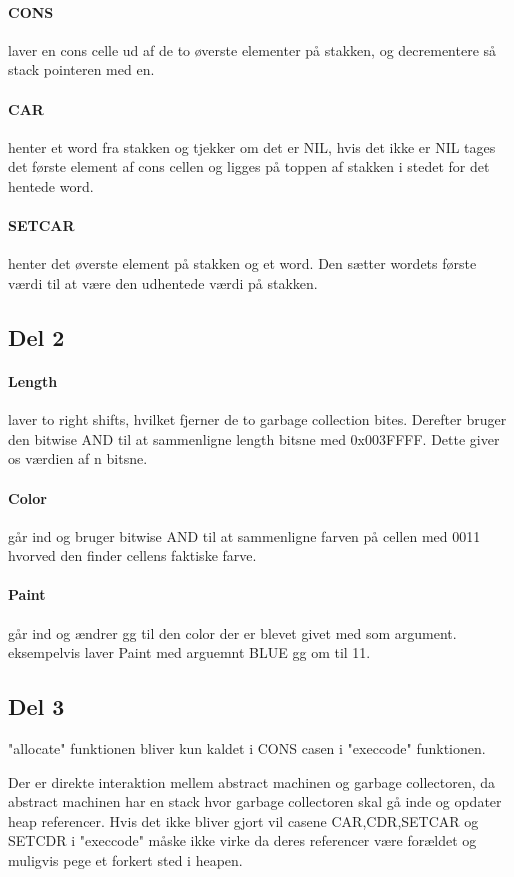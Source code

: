 	\paragraph{CONS} laver en cons celle ud af de to øverste elementer på stakken, og decrementere så stack pointeren med en.
	\paragraph{CAR} henter et word fra stakken og tjekker om det er NIL, hvis det ikke er NIL tages det første element af cons cellen og ligges på toppen af stakken i stedet for det hentede word.
	\paragraph{SETCAR} henter det øverste element på stakken og et word. Den sætter wordets første værdi til at være den udhentede værdi på stakken.

\subsection{Del 2}
\label{O1_2}
	\paragraph{Length} laver to right shifts, hvilket fjerner de to garbage collection bites. Derefter bruger den bitwise AND til at sammenligne length bitsne med 0x003FFFF. Dette giver os værdien af n bitsne.
	\paragraph{Color} går ind og bruger bitwise AND til at sammenligne farven på cellen med 0011 hvorved den finder cellens faktiske farve.
	\paragraph{Paint} går ind og ændrer gg til den color der er blevet givet med som argument. eksempelvis laver Paint med arguemnt BLUE gg om til 11.

\subsection{Del 3}
\label{O1_3}
"allocate" funktionen bliver kun kaldet i CONS casen i "execcode" funktionen.  

Der er direkte interaktion mellem abstract machinen og garbage collectoren, da abstract machinen har en stack hvor garbage collectoren skal gå inde og opdater heap referencer. Hvis det ikke bliver gjort vil casene CAR,CDR,SETCAR og SETCDR i "execcode" måske ikke virke da deres referencer være forældet og muligvis pege et forkert sted i heapen. 

